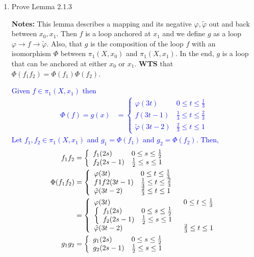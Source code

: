 \documentclass[12pt,a4paper]{report}
\newcommand{\BLUE}[1]{\textcolor{blue}{#1}}
\newcommand{\FUNDG}[1]{\pi_1(#1)}
\begin{document}
\begin{enumerate}[label=2.7.\arabic*]
{\begin{itemize}
\begin{align*}
	\end{align*}
	\item Identity: WTS $\exists e \to ae=a, \, \forall a$. \\
	Let $\iota: (S_1, 1) \to (X, x_0)$ be $\iota(t) = x_0$ for all $t \in [0,1]$.  That is, $i$ collapses to the trival Fundamental Group.  Then 
	\begin{align*}
		\iota f &= \BINDEF{f(2t), & 0\le t \le \frac{1}{2}}{x_0, & \frac{1}{2}\le t \le 1} 
	\end{align*}$\iota f \simeq f$ as $\iota f$ maps entirely to $f$ just twice as ``fast".
	\item Commutativity: WTS $ab \simeq ba\, \forall a,b$
\end{itemize}\textbf{Note: its a group based on $\simeq$ not on $=$.}
}

\item Prove Lemma 2.1.3

\textbf{Notes:}  This lemma describes a mapping and its negative $\varphi, \tilde{\varphi}$ out and back between $x_0, x_1$.  Then $f$ is a loop anchored at $x_1$ and we define $g$ as a loop $\varphi \to f \to \tilde{\varphi}$.  Also, that $g$ is the composition of the loop $f$ with an isomorphism $\Phi$ between $\pi_1(X, x_0)$ and $\pi_1(X, x_1)$.  In the end, $g$ is a loop that can be anchored at either $x_0$ or $x_1$.  \textbf{WTS} that $\Phi(f_1f_2)=\Phi(f_1)\Phi(f_2)$.

\BLUE{Given $f \in \pi_1(X, x_1)$ then 
\begin{align*}
	\Phi(f) = g(x) &= \left \{ \begin{array}{ll}
		\varphi(3t) & 0\le t \le \frac{1}{3} \\
		f(3t-1) & \frac{1}{3} \le t \le \frac{2}{3}  \\
	\tilde{\varphi}(3t-2) & \frac{2}{3} \le t \le 1		
	\end{array}\right .
\end{align*}Let $f_1,f_2 \in \FUNDG{X,x_1}$ and $g_1 = \Phi(f_1)$ and $g_2 = \Phi(f_2)$.  Then,
\begin{align*}
	f_1f_2 &= \left \{ \begin{array}{ll} f_1(2s) & 0\le s \le \frac{1}{2}\\ 
	f_2(2s-1) & \frac{1}{2} \le s \le 1 \end{array} \right . \\
	\Phi(f_1f_2) &= \left \{ \begin{array}{ll}
		\varphi(3t) & 0\le t \le \frac{1}{3} \\ 
		f1f2(3t-1) & \frac{1}{3} \le t \le \frac{2}{3} \\
	\tilde{\varphi}(3t-2) & \frac{2}{3} \le t \le 1	\end{array}
	\right . \\
	&= \left \{ \begin{array}{ll}
		\varphi(3t) & 0\le t \le \frac{1}{3} \\ 
		\left \{ \begin{array}{ll} f_1(2s) & 0\le s \le \frac{1}{2}\\ 
	f_2(2s-1) & \frac{1}{2} \le s \le 1 \end{array} \right . \\
	\tilde{\varphi}(3t-2) & \frac{2}{3} \le t \le 1	\end{array}
	\right . \\
	g_1g_2 &= \left \{ \begin{array}{ll} g_1(2s) & 0\le s \le \frac{1}{2}\\ 
	g_2(2s-1) & \frac{1}{2} \le s \le 1 \end{array} \right .
\end{align*}
}


\end{enumerate}
\end{document}
